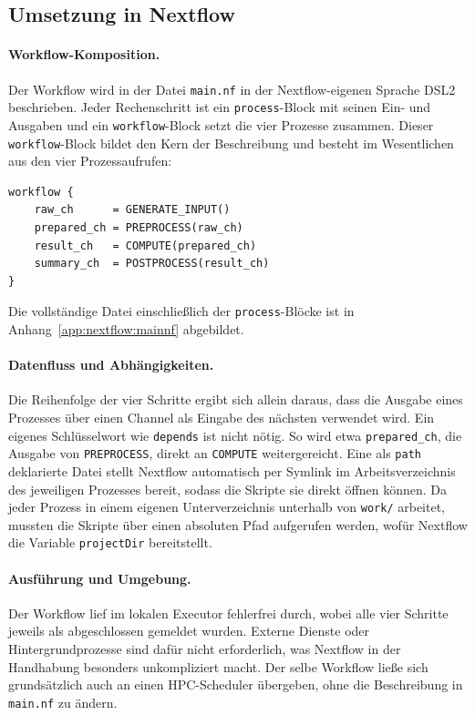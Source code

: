 \subsection{Umsetzung in Nextflow}
\label{sec:practical:pipeline:nextflow}

\paragraph{Workflow-Komposition.}
Der Workflow wird in der Datei \texttt{main.nf} in der Nextflow-eigenen Sprache DSL2 beschrieben.
Jeder Rechenschritt ist ein \texttt{process}-Block mit seinen Ein- und Ausgaben und ein
\texttt{workflow}-Block setzt die vier Prozesse zusammen. Dieser \texttt{workflow}-Block bildet den
Kern der Beschreibung und besteht im Wesentlichen aus den vier Prozessaufrufen:

\begin{lstlisting}[caption={workflow-Block aus main.nf (Nextflow, Pipeline)},label={lst:pipe:nf:workflow}]
workflow {
    raw_ch      = GENERATE_INPUT()
    prepared_ch = PREPROCESS(raw_ch)
    result_ch   = COMPUTE(prepared_ch)
    summary_ch  = POSTPROCESS(result_ch)
}
\end{lstlisting}

Die vollständige Datei einschließlich der \texttt{process}-Blöcke ist in
Anhang~\ref{app:nextflow:mainnf} abgebildet.

\paragraph{Datenfluss und Abhängigkeiten.}
Die Reihenfolge der vier Schritte ergibt sich allein daraus, dass die Ausgabe eines Prozesses über
einen Channel als Eingabe des nächsten verwendet wird. Ein eigenes Schlüsselwort wie
\texttt{depends} ist nicht nötig. So wird etwa \texttt{prepared\_ch}, die Ausgabe von
\texttt{PREPROCESS}, direkt an \texttt{COMPUTE} weitergereicht. Eine als \texttt{path} deklarierte
Datei stellt Nextflow automatisch per Symlink im Arbeitsverzeichnis des jeweiligen Prozesses
bereit, sodass die Skripte sie direkt öffnen können. Da jeder Prozess in einem eigenen
Unterverzeichnis unterhalb von \texttt{work/} arbeitet, mussten die Skripte über einen absoluten
Pfad aufgerufen werden, wofür Nextflow die Variable \texttt{projectDir} bereitstellt.

\paragraph{Ausführung und Umgebung.}
Der Workflow lief im lokalen Executor fehlerfrei durch, wobei alle vier Schritte jeweils als
abgeschlossen gemeldet wurden. Externe Dienste oder Hintergrundprozesse sind dafür nicht
erforderlich, was Nextflow in der Handhabung besonders unkompliziert macht. Der selbe Workflow ließe sich grundsätzlich auch an einen HPC-Scheduler
übergeben, ohne die Beschreibung in \texttt{main.nf} zu ändern.

